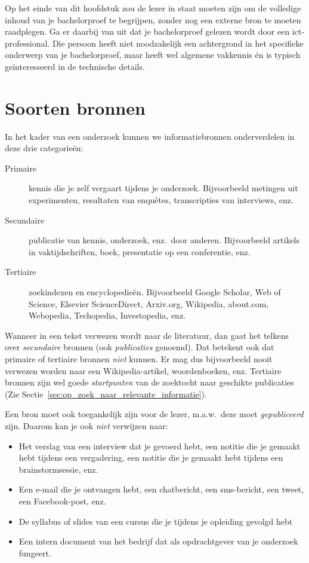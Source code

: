 Op het einde van dit hoofdstuk zou de lezer in staat moeten zijn om de volledige inhoud van je bachelorproef te begrijpen, zonder nog een externe bron te moeten raadplegen. Ga er daarbij van uit dat je bachelorproef gelezen wordt door een ict-professional. Die persoon heeft niet noodzakelijk een achtergrond in het specifieke onderwerp van je bachelorproef, maar heeft wel algemene vakkennis én is typisch geïnteresseerd in de technische details.

\section{Soorten bronnen}%
\label{sec:soorten-bronnen}

In het kader van een onderzoek kunnen we informatiebronnen onderverdelen in deze drie categorieën:

\begin{description}
  \item[Primaire] kennis die je zelf vergaart tijdens je onderzoek. Bijvoorbeeld metingen uit experimenten, resultaten van enquêtes, transcripties van interviews, enz.
  \item[Secundaire] publicatie van kennis, onderzoek, enz.~door anderen. Bijvoorbeeld artikels in vaktijdschriften, boek, presentatie op een conferentie, enz.
  \item[Tertiaire] zoekindexen en encyclopedieën. Bijvoorbeeld Google Scholar, Web of Science, Elsevier ScienceDirect, Arxiv.org, Wikipedia, about.com, Webopedia, Techopedia, Investopedia, enz.
\end{description}

Wanneer in een tekst verwezen wordt naar de literatuur, dan gaat het telkens over \emph{secundaire} bronnen (ook \emph{publicaties} genoemd). Dat betekent ook dat primaire of tertiaire bronnen \emph{niet} kunnen. Er mag dus bijvoorbeeld nooit verwezen worden naar een Wikipedia-artikel, woordenboeken, enz. Tertiaire bronnen zijn wel goede \textit{startpunten} van de zoektocht naar geschikte publicaties (Zie Sectie~\ref{sec:op_zoek_naar_relevante_informatie}).

Een bron moet ook toegankelijk zijn voor de lezer, m.a.w.\ deze moet \textit{gepubliceerd} zijn. Daarom kan je ook \textit{niet} verwijzen naar:

\begin{itemize}
  \item Het verslag van een interview dat je gevoerd hebt, een notitie die je gemaakt hebt tijdens een vergadering, een notitie die je gemaakt hebt tijdens een brainstormsessie, enz.
  \item Een e-mail die je ontvangen hebt, een chatbericht, een sms-bericht, een tweet, een Facebook-post, enz.
  \item De syllabus of slides van een cursus die je tijdens je opleiding gevolgd hebt
  \item Een intern document van het bedrijf dat als opdrachtgever van je onderzoek fungeert.
\end{itemize}

